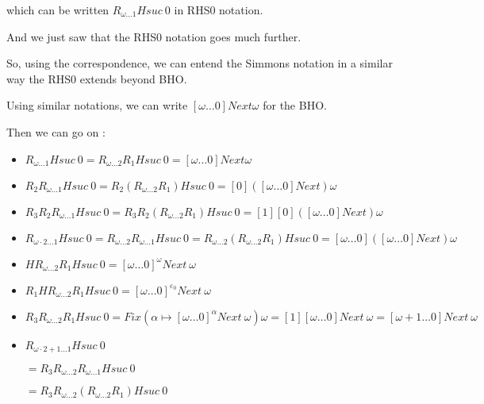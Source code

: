 \documentclass[10pt]{article}
\begin{document}
which can be written \( R_{\omega \ldots 1} H suc\ 0 \) in RHS0 notation.

And we just saw that the RHS0 notation goes much further.

So, using the correspondence, we can entend the Simmons notation in a similar way the RHS0 extends beyond BHO.

Using similar notations, we can write \( [\omega \ldots 0] Next \omega \) for the BHO. 

Then we can go on :

\begin{itemize}
     \setlength{\itemsep}{1pt}
     \setlength{\parskip}{0pt}
     \setlength{\parsep}{0pt}

\item \( R_{\omega \ldots 1} H suc\ 0 = R_{\omega \ldots 2} R_1 H suc\ 0 = [\omega \ldots 0] Next \omega \)

\item \( R_2 R_{\omega \ldots 1} H suc\ 0 = R_2 (R_{\omega \ldots 2} R_1) H suc\ 0 = [0] ([\omega \ldots 0] Next) \omega \)

\item \( R_3 R_2 R_{\omega \ldots 1} H suc\ 0 = R_3 R_2 (R_{\omega \ldots 2} R_1) H suc\ 0 = [1] [0] ([\omega \ldots 0] Next) \omega \)

\item \( R_{\omega \cdot 2 \ldots 1} H suc\ 0 = R_{\omega \ldots 2} R_{\omega \ldots 1} H suc\ 0 = R_{\omega \ldots 2} (R_{\omega \ldots 2} R_1) H suc\ 0 = [\omega \ldots 0] ([\omega \ldots 0] Next) \omega \)

\item \( H R_{\omega \ldots 2} R_1 H suc\ 0 = [\omega \ldots 0]^\omega Next\ \omega \)

\item \( R_1 H R_{\omega \ldots 2} R_1 H suc\ 0 = [\omega \ldots 0]^{\varepsilon_0} Next\ \omega \)

\item \( R_3 R_{\omega \ldots 2} R_1 H suc\ 0 = Fix (\alpha \mapsto [\omega \ldots 0]^\alpha Next\ \omega) \omega = [1] [\omega \ldots 0] Next\ \omega = [\omega+1 \ldots 0] Next\ \omega \)

\item \( R_{\omega \cdot 2 + 1 \ldots 1} H suc\ 0 \)

\( = R_3 R_{\omega \ldots 2} R_{\omega \ldots 1} H suc\ 0 \)

\( = R_3 R_{\omega \ldots 2} (R_{\omega \ldots 2} R_1) H suc\ 0 \)


\end{itemize}
\end{document}
